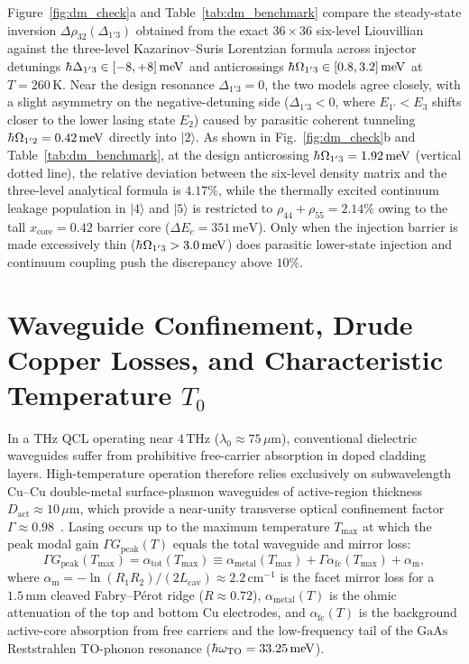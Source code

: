 \documentclass[11pt,letterpaper]{article}
\renewcommand{\hbar}{\mathchar'26\mkern-9mu h}
\begin{document}
Figure~\ref{fig:dm_check}a and Table~\ref{tab:dm_benchmark} compare the steady-state inversion $\Delta\rho_{32}(\Delta_{1'3})$ obtained from the exact $36\times 36$ six-level Liouvillian against the three-level Kazarinov--Suris Lorentzian formula across injector detunings $\hbar\Delta_{1'3} \in [-8, +8]\,\mathrm{meV}$ and anticrossings $\hbar\Omega_{1'3} \in [0.8, 3.2]\,\mathrm{meV}$ at $T = 260\,\mathrm{K}$. Near the design resonance $\Delta_{1'3} = 0$, the two models agree closely, with a slight asymmetry on the negative-detuning side ($\Delta_{1'3} < 0$, where $E_{1'} < E_3$ shifts closer to the lower lasing state $E_2$) caused by parasitic coherent tunneling $\hbar\Omega_{1'2} = 0.42\,\mathrm{meV}$ directly into $|2\rangle$. As shown in Fig.~\ref{fig:dm_check}b and Table~\ref{tab:dm_benchmark}, at the design anticrossing $\hbar\Omega_{1'3} = 1.92\,\mathrm{meV}$ (vertical dotted line), the relative deviation between the six-level density matrix and the three-level analytical formula is $4.17\%$, while the thermally excited continuum leakage population in $|4\rangle$ and $|5\rangle$ is restricted to $\rho_{44} + \rho_{55} = 2.14\%$ owing to the tall $x_{\mathrm{core}} = 0.42$ barrier core ($\Delta E_c = 351\,\mathrm{meV}$). Only when the injection barrier is made excessively thin ($\hbar\Omega_{1'3} > 3.0\,\mathrm{meV}$) does parasitic lower-state injection and continuum coupling push the discrepancy above $10\%$.

\section{Waveguide Confinement, Drude Copper Losses, and Characteristic Temperature $T_0$}
\label{sec:waveguide}

In a THz QCL operating near $4\,\mathrm{THz}$ ($\lambda_0 \approx 75\,\mu\mathrm{m}$), conventional dielectric waveguides suffer from prohibitive free-carrier absorption in doped cladding layers. High-temperature operation therefore relies exclusively on subwavelength $\mathrm{Cu}$--$\mathrm{Cu}$ double-metal surface-plasmon waveguides of active-region thickness $D_{\mathrm{act}} \approx 10\,\mu\mathrm{m}$, which provide a near-unity transverse optical confinement factor $\Gamma \approx 0.98$~\cite{Williams2007,Belkin2008,Khalatpour2021}. Lasing occurs up to the maximum temperature $T_{\max}$ at which the peak modal gain $\Gamma G_{\mathrm{peak}}(T)$ equals the total waveguide and mirror loss:
\begin{equation}
\Gamma G_{\mathrm{peak}}(T_{\max}) = \alpha_{\mathrm{tot}}(T_{\max}) \equiv \alpha_{\mathrm{metal}}(T_{\max}) + \Gamma \alpha_{\mathrm{fc}}(T_{\max}) + \alpha_{\mathrm{m}},
\label{eq:threshold_condition}
\end{equation}
where $\alpha_{\mathrm{m}} = -\ln(R_1 R_2)/(2 L_{\mathrm{cav}}) \approx 2.2\,\mathrm{cm}^{-1}$ is the facet mirror loss for a $1.5\,\mathrm{mm}$ cleaved Fabry--P\'erot ridge ($R \approx 0.72$), $\alpha_{\mathrm{metal}}(T)$ is the ohmic attenuation of the top and bottom $\mathrm{Cu}$ electrodes, and $\alpha_{\mathrm{fc}}(T)$ is the background active-core absorption from free carriers and the low-frequency tail of the $\mathrm{GaAs}$ Reststrahlen TO-phonon resonance ($\hbar\omega_{\mathrm{TO}} = 33.25\,\mathrm{meV}$).
\end{document}
